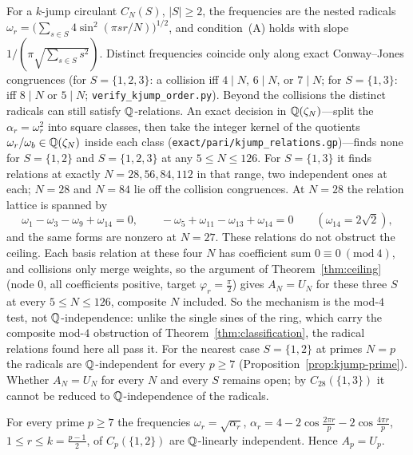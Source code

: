 \begin{remark}\label{rem:kjump}
For a $k$-jump circulant $C_N(S)$, $|S|\ge2$, the frequencies are the nested radicals
$\omega_r=\bigl(\sum_{s\in S}4\sin^2(\pi sr/N)\bigr)^{1/2}$, and condition~(A) holds with slope
$1/(\pi\sqrt{\sum_{s\in S}s^2})$. Distinct frequencies coincide only along exact Conway--Jones congruences
(for $S=\{1,2,3\}$: a collision iff $4\mid N$, $6\mid N$, or $7\mid N$; for $S=\{1,3\}$: iff $8\mid N$ or
$5\mid N$; \texttt{verify\_kjump\_order.py}). Beyond the collisions the distinct radicals can still satisfy
$\mathbb{Q}$-relations. An exact decision in $\mathbb{Q}(\zeta_N)$---split the $\alpha_r=\omega_r^2$ into square classes, then take the integer kernel of the
quotients $\omega_r/\omega_b\in\mathbb{Q}(\zeta_N)$ inside each class (\texttt{exact/pari/kjump\_relations.gp})---finds
none for $S=\{1,2\}$ and $S=\{1,2,3\}$ at any $5\le N\le126$. For $S=\{1,3\}$ it finds relations at exactly
$N=28,56,84,112$ in that range, two independent ones at each; $N=28$ and $N=84$ lie off the collision
congruences. At $N=28$ the relation lattice is spanned by
\[
  \omega_1-\omega_3-\omega_9+\omega_{14}=0,\qquad -\omega_5+\omega_{11}-\omega_{13}+\omega_{14}=0
  \qquad(\omega_{14}=2\sqrt2),
\]
and the same forms are nonzero at $N=27$. These relations do not obstruct the ceiling. Each basis relation
at these four $N$ has coefficient sum $0\equiv0\ (\mathrm{mod}\ 4)$, and collisions only merge weights,
so the argument of Theorem~\ref{thm:ceiling} (node $0$, all coefficients positive, target
$\varphi_r=\tfrac\pi2$) gives $A_N=U_N$ for these three $S$ at every $5\le N\le126$, composite $N$ included. So
the mechanism is the mod-$4$ test, not $\mathbb{Q}$-independence: unlike the single sines of the ring, which carry
the composite mod-$4$ obstruction of Theorem~\ref{thm:classification}, the radical relations found here
all pass it. For the nearest case $S=\{1,2\}$ at primes $N=p$ the radicals are $\mathbb{Q}$-independent for
every $p\ge7$ (Proposition~\ref{prop:kjump-prime}). Whether $A_N=U_N$ for every $N$ and every $S$ remains
open; by $C_{28}(\{1,3\})$ it cannot be reduced to $\mathbb{Q}$-independence of the radicals.
\end{remark}

\begin{proposition}\label{prop:kjump-prime}
For every prime $p\ge7$ the frequencies $\omega_r=\sqrt{\alpha_r}$,
$\alpha_r=4-2\cos\tfrac{2\pi r}p-2\cos\tfrac{4\pi r}p$, $1\le r\le k=\tfrac{p-1}2$, of $C_p(\{1,2\})$ are
$\mathbb{Q}$-linearly independent. Hence $A_p=U_p$.
\end{proposition}

